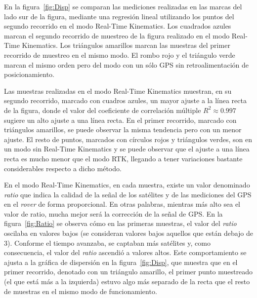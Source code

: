 En la figura~\ref{fig:Disp} se comparan las mediciones realizadas en las marcas del lado sur de la figura, mediante una regresión lineal utilizando los puntos del segundo recorrido en el modo Real-Time Kinematics. Los cuadrados azules marcan el segundo recorrido de muestreo de la figura realizado en el modo Real-Time Kinematics. Los triángulos amarillos marcan las muestras del primer recorrido de muestreo en el mismo modo. El rombo rojo y el triángulo verde marcan el mismo orden pero del modo con un sólo GPS sin retroalimentación de posicionamiento.\\

\newpage

Las muestras realizadas en el modo Real-Time Kinematics muestran, en su segundo recorrido, marcado con cuadros azules, un mayor ajuste a la línea recta de la figura, donde el valor del coeficiente de correlación múltiple $R^{2} \approx 0.997$\footnotemark sugiere un alto ajuste a una línea recta. En el primer recorrido, marcado con triángulos amarillos, se puede observar la misma tendencia pero con un menor ajuste. El resto de puntos, marcados con círculos rojos y triángulos verdes, son en un modo sin Real-Time Kinematics y se puede observar que el ajuste a una línea recta es mucho menor que el modo RTK, llegando a tener variaciones bastante considerables respecto a dicho método.\\


En el modo Real-Time Kinematics, en cada muestra, existe un valor denominado \textit{ratio} que indica la calidad de la señal de los satélites y de las mediciones del GPS en el \textit{rover} de forma proporcional. En otras palabras, mientras más alto sea el valor de ratio, mucha mejor será la corrección de la señal de GPS. En la figura~\ref{fig:Ratio} se observa cómo en las primeras muestras, el valor del \textit{ratio} oscilaba en valores bajos (se consideran valores bajos aquellos que están debajo de 3). Conforme el tiempo avanzaba, se captaban más satélites y, como consecuencia, el valor del \textit{ratio} ascendió a valores altos. Este comportamiento se ajusta a la gráfica de dispersión en la figura~\ref{fig:Disp}, que muestra que en el primer recorrido, denotado con un triángulo amarillo, el primer punto muestreado (el que está más a la izquierda) estuvo algo más separado de la recta que el resto de muestras en el mismo modo de funcionamiento.

